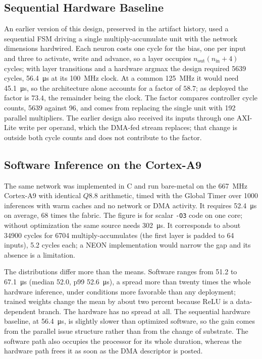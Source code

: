\documentclass[final,5p,times,twocolumn]{elsarticle}
\begin{document}
\subsection{Sequential Hardware Baseline}
\label{sec:baseline}
An earlier version of this design, preserved in the artifact history, used a
sequential FSM driving a single multiply-accumulate unit with the network
dimensions hardwired. Each neuron costs one cycle for the bias, one per input
and three to activate, write and advance, so a layer occupies
$n_{\text{out}}(n_{\text{in}}+4)$ cycles; with layer transitions and a hardware
argmax the design required \num{5639} cycles, \SI{56.4}{\micro\second} at its
\SI{100}{\mega\hertz} clock. At a common \SI{125}{\mega\hertz} it would need
\SI{45.1}{\micro\second}, so the architecture alone accounts for a factor of
$58.7$; as deployed the factor is $73.4$, the remainder being the clock. The
factor compares controller cycle counts, \num{5639} against 96, and comes from
replacing the single unit with 192 parallel multipliers. The earlier design
also received its inputs through one AXI-Lite write per operand, which the
DMA-fed stream replaces; that change is outside both cycle counts and does not
contribute to the factor.

\subsection{Software Inference on the Cortex-A9}
\label{sec:arm_baseline}
The same network was implemented in C and run bare-metal on the
\SI{667}{\mega\hertz} Cortex-A9 with identical $Q8.8$ arithmetic, timed with the
Global Timer over \num{1000} inferences with warm caches and no network or DMA
activity. It requires \SI{52.4}{\micro\second} on average, 68 times the fabric.
The figure is for scalar \texttt{-O3} code on one core; without optimization the
same source needs \SI{302}{\micro\second}. It corresponds to about \num{34900}
cycles for 6704 multiply-accumulates (the first layer is padded to 64 inputs),
5.2 cycles each; a NEON implementation would narrow the gap and its absence is
a limitation.

The distributions differ more than the means. Software ranges from
\SI{51.2}{} to \SI{67.1}{\micro\second} (median \SI{52.0}{}, p99
\SI{52.6}{\micro\second}), a spread more than twenty times the whole hardware
inference, under conditions more favorable than any deployment; trained weights
change the mean by about two percent because ReLU is a data-dependent branch.
The hardware has no spread at all. The sequential hardware baseline, at
\SI{56.4}{\micro\second}, is slightly slower than optimized software, so the
gain comes from the parallel issue structure rather than from the change of
substrate. The software path also occupies the processor for its whole duration,
whereas the hardware path frees it as soon as the DMA descriptor is posted.
\end{document}

